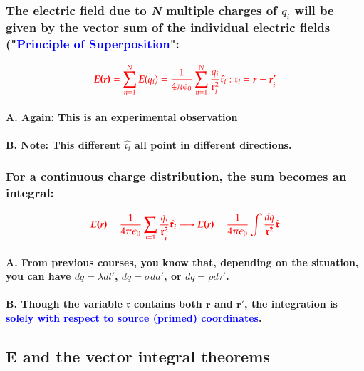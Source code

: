 \documentclass{article}
\begin{document}
\subsubsection{The electric field due to \textit{N} multiple charges of $q_i$ will be given by the vector sum of the individual electric fields ("\textcolor{blue}{Principle of Superposition}":}
\begin{equation*}
    \textcolor{red}{\boldsymbol{E(r)}=\sum_{n=1}^N\boldsymbol{E}(q_i)=\frac{1}{4\pi\epsilon_0}\sum_{n=1}^N\frac{q_i}{\mathfrak{r}_i^2}\hat{\mathfrak{r}_i}:\mathfrak{r}_i=\boldsymbol{r-r_i'}}
\end{equation*}
\paragraph{A. Again: This is an experimental observation}
\paragraph{B. Note: This different $\hat{\mathfrak{r}_i}$ all point in different directions.}
\subsubsection{For a continuous charge distribution, the sum becomes an integral:}
\begin{equation*}
    \textcolor{red}{\boldsymbol{E(r)}=\frac{1}{4\pi\epsilon_0}\sum_{i=1}\frac{q_i}{\boldsymbol{\mathfrak{r}_i^2}}\hat{\boldsymbol{\mathfrak{r}_i}}\longrightarrow\boldsymbol{E(r)}=\frac{1}{4\pi\epsilon_0}\int\frac{dq}{\boldsymbol{\mathfrak{r}^2}}\hat{\boldsymbol{\mathfrak{r}}}}
\end{equation*}
\paragraph{A. From previous courses, you know that, depending on the situation, you can have $dq=\lambda dl'$, $dq=\sigma da'$, or $dq=\rho d\tau'$.}
\paragraph{B. Though the variable $\mathfrak{r}$ contains both $\boldsymbol{r}$ and $\boldsymbol{r'}$, the integration is \textcolor{blue}{solely with respect to source (primed) coordinates}.}
\subsection{$\boldsymbol{E}$ and the vector integral theorems}
\end{document}
